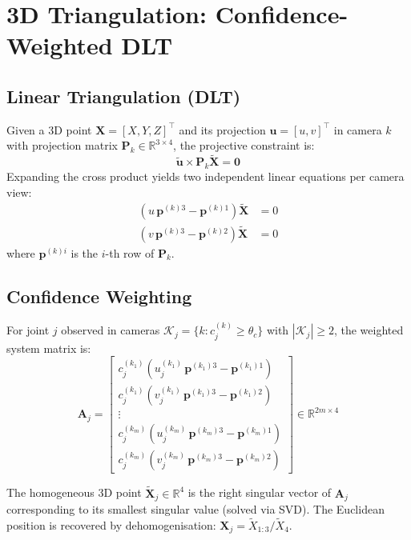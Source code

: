 \documentclass[11pt,a4paper]{article}
\newcommand{\R}{\mathbb{R}}
\begin{document}
\section{3D Triangulation: Confidence-Weighted DLT}

\subsection{Linear Triangulation (DLT)}

Given a 3D point $\mathbf{X} = [X, Y, Z]^\top$ and its projection
$\mathbf{u} = [u, v]^\top$ in camera $k$ with projection matrix
$\mathbf{P}_k \in \R^{3 \times 4}$, the projective constraint is:
\[
  \tilde{\mathbf{u}} \times \mathbf{P}_k \tilde{\mathbf{X}} = \mathbf{0}
\]
Expanding the cross product yields two independent linear equations per camera view:
\begin{align}
  (u\,\mathbf{p}^{(k)3} - \mathbf{p}^{(k)1}) \tilde{\mathbf{X}} &= 0 \label{eq:dlt1}\\
  (v\,\mathbf{p}^{(k)3} - \mathbf{p}^{(k)2}) \tilde{\mathbf{X}} &= 0 \label{eq:dlt2}
\end{align}
where $\mathbf{p}^{(k)i}$ is the $i$-th row of $\mathbf{P}_k$.

\subsection{Confidence Weighting}

For joint $j$ observed in cameras $\mathcal{K}_j = \{k : c^{(k)}_j \geq \theta_c\}$
with $|\mathcal{K}_j| \geq 2$, the weighted system matrix is:
\begin{equation}
  \mathbf{A}_j = \begin{bmatrix}
    c^{(k_1)}_j(u^{(k_1)}_j\,\mathbf{p}^{(k_1)3} - \mathbf{p}^{(k_1)1}) \\
    c^{(k_1)}_j(v^{(k_1)}_j\,\mathbf{p}^{(k_1)3} - \mathbf{p}^{(k_1)2}) \\
    \vdots \\
    c^{(k_m)}_j(u^{(k_m)}_j\,\mathbf{p}^{(k_m)3} - \mathbf{p}^{(k_m)1}) \\
    c^{(k_m)}_j(v^{(k_m)}_j\,\mathbf{p}^{(k_m)3} - \mathbf{p}^{(k_m)2})
  \end{bmatrix} \in \R^{2m \times 4}
  \label{eq:dlt_weighted}
\end{equation}

The homogeneous 3D point $\tilde{\mathbf{X}}_j \in \R^4$ is the right singular vector
of $\mathbf{A}_j$ corresponding to its smallest singular value (solved via SVD). The
Euclidean position is recovered by dehomogenisation: $\mathbf{X}_j = \tilde{X}_{1:3}
/ \tilde{X}_4$.
\end{document}
